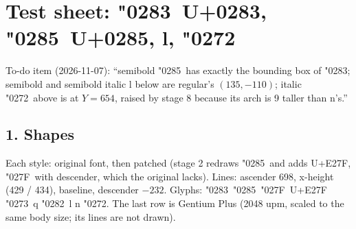 \documentclass[10pt]{article}
\begin{document}
\section*{Test sheet: \char"0283\ U+0283, \char"0285\ U+0285, l, \char"0272}

To-do item (2026-11-07): ``semibold \char"0285\ has exactly the bounding box of \char"0283;
semibold and semibold italic l below are regular's $(135, -110)$;
italic \char"0272\ above is at $Y = 654$, raised by stage 8 because its arch is 9 taller than n's.''

\subsection*{1. Shapes}
Each style: original font, then patched (stage 2 redraws \char"0285\ and adds U+E27F, \char"027F\ with descender, which the original lacks).
Lines: ascender 698, x-height (429 / 434), baseline, descender $-232$.
Glyphs: \char"0283\ \char"0285\ \char"027F\ U+E27F \char"0273\ q \char"0282\ l n \char"0272. The last row is Gentium Plus (2048 upm, scaled to the same body size; its lines are not drawn).

\medskip
\end{document}
